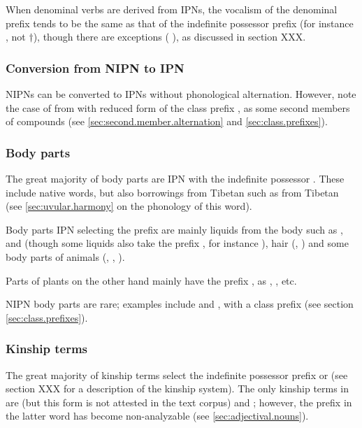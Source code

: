 When denominal verbs are derived from IPNs, the vocalism of the denominal prefix tends to be the same as that of the  indefinite possessor prefix (for instance  \fl{} , not $\dagger$), though there are exceptions ( \fl{} ), as discussed in section XXX.

\subsubsection{Conversion from NIPN to IPN} \label{sec:nipn.to.ipn}
NIPNs can be converted to IPNs  without phonological alternation. However, note the case of  from  with reduced form  of the class prefix , as some second members of compounds (see \ref{sec:second.member.alternation} and \ref{sec:class.prefixes}).

\subsubsection{Body parts} \label{sec:body.part}
The great majority of body parts are IPN with the indefinite possessor . These include native words, but also borrowings from Tibetan such as  from Tibetan  (see \ref{sec:uvular.harmony} on the phonology of this word).

Body parts IPN selecting the prefix  are mainly liquids from the body such as ,  and  (though some liquids also take the prefix , for instance ), hair (, ) and some body parts of animals (, , ).

Parts of plants on the other hand mainly have the prefix , as , ,  etc.

NIPN body parts are rare; examples include  and , with a  class prefix (see section \ref{sec:class.prefixes}).

\subsubsection{Kinship terms} \label{sec:kinship}
The great majority of kinship terms select the indefinite possessor prefix  or  (see section XXX for a description of the kinship system). The only kinship terms in  are  (but this form is not attested in the text corpus) and ; however, the  prefix in the latter word has become non-analyzable (see \ref{sec:adjectival.nouns}). 


